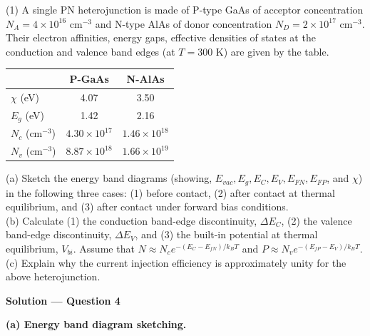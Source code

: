 \begin{question}[Question 4]
(1) A single PN heterojunction is made of P-type GaAs of acceptor concentration $N_A = 4\times 10^{16}$ cm$^{-3}$ and N-type AlAs of donor concentration $N_D = 2\times 10^{17}$ cm$^{-3}$. Their electron affinities, energy gaps, effective densities of states at the conduction and valence band edges (at $T = 300$ K) are given by the table.

\begin{center}
\begin{tabular}{|l|c|c|}
\hline
 & P-GaAs & N-AlAs \\
\hline
$\chi$ (eV) & 4.07 & 3.50 \\
\hline
$E_g$ (eV) & 1.42 & 2.16 \\
\hline
$N_c$ (cm$^{-3}$) & $4.30 \times 10^{17}$ & $1.46 \times 10^{18}$ \\
\hline
$N_v$ (cm$^{-3}$) & $8.87 \times 10^{18}$ & $1.66 \times 10^{19}$ \\
\hline
\end{tabular}
\end{center}

(a) Sketch the energy band diagrams (showing, $E_{vac}, E_g, E_C, E_V, E_{FN}, E_{FP}$, and $\chi$) in the following three cases: (1) before contact, (2) after contact at thermal equilibrium, and (3) after contact under forward bias conditions.\\
(b) Calculate (1) the conduction band-edge discontinuity, $\Delta E_C$, (2) the valence band-edge discontinuity, $\Delta E_V$, and (3) the built-in potential at thermal equilibrium, $V_{bi}$. Assume that $N \approx N_c e^{-(E_C - E_{fN})/k_BT}$ and $P \approx N_v e^{-(E_{fP} - E_V)/k_BT}$.\\
(c) Explain why the current injection efficiency is approximately unity for the above heterojunction.
\end{question}

\textbf{\large Solution --- Question 4}

\textbf{(a) Energy band diagram sketching.}

